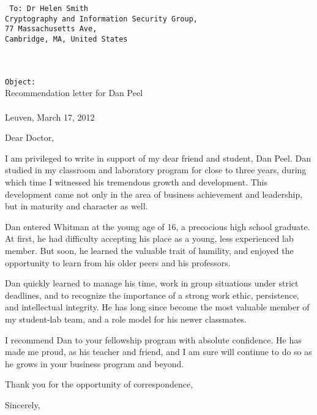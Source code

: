 \documentclass[a4paper,11pt]{article}
\begin{document}
\begin{multicols}{2}
\hfill\vfill
\columnbreak
{
\tt \fontsize{10.5}{14}
To: Dr Helen Smith\\
Cryptography and Information Security Group,\\
77 Massachusetts Ave,\\
Cambridge, MA, United States
\\\\\\
}
\end{multicols}

\begin{multicols}{2}
{\tt Object:}\\ 
Recommendation letter for Dan Peel
\\\\
Leuven, March 17, 2012
\end{multicols}

Dear Doctor, 

I am privileged to write in support of my dear friend and student, Dan Peel. Dan studied in my classroom and
laboratory program for close to three years, during which time I witnessed his tremendous growth and development. This
development came not only in the area of business achievement and leadership, but in maturity and character as well.

Dan entered Whitman at the young age of 16, a precocious high school graduate. At first, he had difficulty accepting his
place as a young, less experienced lab member. But soon, he learned the valuable trait of humility, and enjoyed the
opportunity to learn from his older peers and his professors.

Dan quickly learned to manage his time, work in group situations under strict deadlines, and to recognize the importance
of a strong work ethic, persistence, and intellectual integrity. He has long since become the most valuable member of
my student-lab team, and a role model for his newer classmates.

I recommend Dan to your fellowship program with absolute confidence. He has made me proud, as his teacher and friend,
and I am sure will continue to do so as he grows in your business program and beyond.

Thank you for the opportunity of correspondence,

Sincerely,
\end{document}
